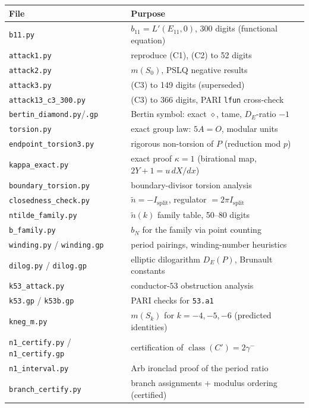 \documentclass[preprint,12pt]{elsarticle}
\theoremstyle{definition}
\theoremstyle{remark}
\DeclareMathOperator{\class}{class}
\begin{document}
\begin{center}
\scriptsize
\begin{tabular}{@{}ll@{}}
\toprule
File & Purpose\\
\midrule
\texttt{b11.py} & $b_{11}=L'(E_{11},0)$, 300 digits (functional equation)\\
\texttt{attack1.py} & reproduce (C1), (C2) to 52 digits\\
\texttt{attack2.py} & $m(S_0)$, PSLQ negative results\\
\texttt{attack3.py} & (C3) to 149 digits (superseded)\\
\texttt{attack13\_c3\_300.py} & (C3) to 366 digits, PARI \texttt{lfun} cross-check\\
\texttt{bertin\_diamond.py}/\texttt{.gp} & Bertin symbol: exact $\diamond$, tame, $D_E$-ratio $-1$\\
\texttt{torsion.py} & exact group law: $5A=O$, modular units\\
\texttt{endpoint\_torsion3.py} & rigorous non-torsion of $P$ (reduction mod $p$)\\
\texttt{kappa\_exact.py} & exact proof $\kappa=1$ (birational map, $2Y+1=u\,dX/dx$)\\
\texttt{boundary\_torsion.py} & boundary-divisor torsion analysis\\
\texttt{closedness\_check.py} & $\tilde n=-I_{\mathrm{split}}$, regulator $=2\pi I_{\mathrm{split}}$\\
\texttt{ntilde\_family.py} & $\tilde n(k)$ family table, 50--80 digits\\
\texttt{b\_family.py} & $b_N$ for the family via point counting\\
\texttt{winding.py} / \texttt{winding.gp} & period pairings, winding-number heuristics\\
\texttt{dilog.py} / \texttt{dilog.gp} & elliptic dilogarithm $D_E(P)$, Brunault constants\\
\texttt{k53\_attack.py} & conductor-$53$ obstruction analysis\\
\texttt{k53.gp} / \texttt{k53b.gp} & PARI checks for \texttt{53.a1}\\
\texttt{kneg\_m.py} & $m(S_k)$ for $k=-4,-5,-6$ (predicted identities)\\
\texttt{n1\_certify.py} / \texttt{n1\_certify.gp} & certification of $\class(C')=2\gamma^-$\\
\texttt{n1\_interval.py} & Arb ironclad proof of the period ratio\\
\texttt{branch\_certify.py} & branch assignments + modulus ordering (certified)\\

\end{tabular}
\end{center}
\end{document}
